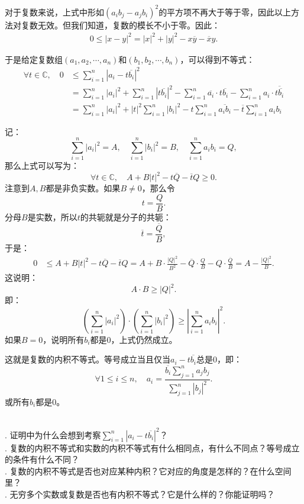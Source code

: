 \documentclass[12pt,UTF8]{ctexbook}
\begin{document}
\begin{appendix}
对于复数来说，上式中形如$(a_ib_j - a_jb_i)^2$的平方项不再大于等于零，因此以上方法对复数无效。但我们知道，复数的模长不小于零。因此：
\begin{align*}
    0 \leqslant |x - y|^2 = |x|^2 + |y|^2 - x\overline{y} - \overline{x} y.
\end{align*}

于是给定复数组$(a_1, a_2, \cdots, a_n)$和$(b_1, b_2, \cdots, b_n)$，可以得到不等式：
\begin{align*}
    \forall t \in \mathbb{C}, \quad 0 &\leqslant \sum_{i=1}^n |a_i - t\overline{b_i}|^2 \\
    &= \sum_{i=1}^n |a_i|^2 + \sum_{i=1}^n |t \overline{b_i}|^2 - \sum_{i=1}^n \overline{a_i} \cdot t\overline{b_i} - \sum_{i=1}^n a_i \cdot \overline{t \overline{b_i}} \\
    &= \sum_{i=1}^n |a_i|^2 + |t|^2 \sum_{i=1}^n |b_i|^2 - t\sum_{i=1}^n \overline{a_ib_i} - \overline{t}\sum_{i=1}^n a_ib_i
\end{align*}

记：
$$ \sum_{i=1}^n |a_i|^2 = A, \quad \sum_{i=1}^n |b_i|^2 = B, \quad \sum_{i=1}^n a_ib_i = Q, $$
那么上式可以写为：
$$ \forall t \in \mathbb{C}, \quad A + B |t|^2 - t\overline{Q} - \overline{t}Q \geqslant 0. $$
注意到$A,B$都是非负实数。如果$ B \neq 0$，那么令
$$ t = \frac{Q}{B}. $$
分母$B$是实数，所以$t$的共轭就是分子的共轭：
$$\overline{t} = \frac{\overline{Q}}{B}, $$
于是：
\begin{align*}
    0 &\leqslant A + B |t|^2 - t\overline{Q} - \overline{t}Q = A + B \cdot \frac{|Q|^2}{B^2} - \overline{Q}\cdot \frac{Q}{B} - Q\cdot \frac{\overline{Q}}{B} = A - \frac{|Q|^2}{B}.
\end{align*}
这说明：
$$ A \cdot B \geqslant |Q|^2.$$
即：
$$ \left(\sum_{i=1}^n |a_i|^2\right)\cdot\left(\sum_{i=1}^n |b_i|^2\right)\geqslant \left|\sum_{i=1}^n a_ib_i\right|^2. $$
如果$B = 0$，说明所有$b_i$都是$0$，上式仍然成立。

这就是复数的内积不等式。等号成立当且仅当$a_i - t\overline{b_i}$总是$0$，即：
$$ \forall 1\leqslant i \leqslant n, \quad a_i = \frac{\overline{b_i} \displaystyle \sum_{j=1}^n a_jb_j}{\displaystyle \sum_{j=1}^n |b_j|^2} . $$
或所有$b_i$都是$0$。

\begin{sk}
    \mbox{} \\
    . 证明中为什么会想到考察$\displaystyle \sum_{i=1}^n |a_i - t\overline{b_i}|^2$？\\
    . 复数的内积不等式和实数的内积不等式有什么相同点，有什么不同点？等号成立的条件有什么不同？\\
    . 复数的内积不等式是否也对应某种内积？它对应的角度是怎样的？在什么空间里？\\
    . 无穷多个实数或复数是否也有内积不等式？它是什么样的？你能证明吗？
\end{sk}

\end{appendix}
\end{document}
